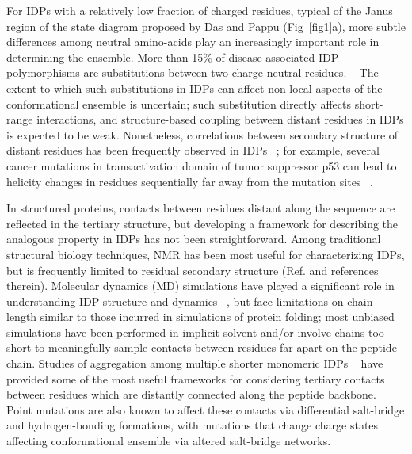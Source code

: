 \documentclass[10pt,letterpaper]{article}
\begin{document}
For IDPs with a relatively low fraction of charged residues, typical of the Janus region of the state diagram proposed by Das and Pappu\cite{Das2015,Das2013a} (Fig~\ref{fig1}a), more subtle differences among neutral amino-acids  play an increasingly important role in determining the ensemble.  More than 15\% of disease-associated IDP polymorphisms are substitutions between two charge-neutral residues. ~\cite {Vacic2012a} The extent to which such substitutions in IDPs can affect non-local aspects of the conformational ensemble is uncertain;  such substitution directly affects short-range interactions, and structure-based coupling between distant residues in IDPs is expected to be weak.  Nonetheless, correlations between secondary structure of distant residues has been frequently observed in IDPs ~\cite{Ganguly2015,Iesmantavicius2013}; for example, several cancer mutations in transactivation domain of tumor suppressor p53 can lead to helicity changes in residues sequentially far away from the mutation sites ~\cite{Ganguly2015}.

In structured proteins, contacts between residues distant along the sequence are reflected in the tertiary structure, but developing a framework for describing the analogous property in IDPs has not been straightforward. Among traditional structural biology techniques, NMR has been most useful for characterizing IDPs, but is frequently limited to residual secondary structure (Ref. \cite{Mittag2007,Habchi2014} and references therein). Molecular dynamics (MD) simulations have played a significant role in understanding IDP structure and dynamics ~\cite{Stanley2015,Ithuralde2016,Knott2012c,Invernizzi2013,Abeln2008,Yedvabny2014}, but face limitations on chain length similar to those incurred in simulations of protein folding; most unbiased simulations have been performed in implicit solvent and/or involve chains too short to meaningfully sample contacts between residues far apart on the peptide chain.  Studies of aggregation among multiple shorter monomeric IDPs ~\cite{Levine2015,Pappu2008}  have provided some of the most useful frameworks for considering tertiary contacts between residues which are distantly connected along the peptide backbone.  Point mutations are also known to affect these contacts via differential salt-bridge and hydrogen-bonding formations, with mutations that change charge states affecting conformational ensemble via altered salt-bridge networks. ~\cite{Levine2015} 
\end{document}

